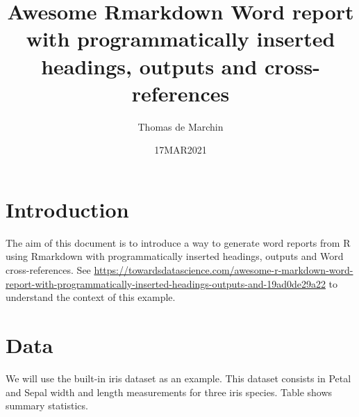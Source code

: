\documentclass[
]{article}
\title{Awesome Rmarkdown Word report with programmatically inserted
headings, outputs and cross-references}
\author{Thomas de Marchin}
\date{17MAR2021}
\begin{document}
\maketitle

\hypertarget{introduction}{%
\section{Introduction}\label{introduction}}

The aim of this document is to introduce a way to generate word reports
from R using Rmarkdown with programmatically inserted headings, outputs
and Word cross-references. See
\url{https://towardsdatascience.com/awesome-r-markdown-word-report-with-programmatically-inserted-headings-outputs-and-19ad0de29a22}
to understand the context of this example.

\hypertarget{data}{%
\section{Data}\label{data}}

We will use the built-in iris dataset as an example. This dataset
consists in Petal and Sepal width and length measurements for three iris
species. Table shows summary statistics.

\providecommand{\docline}[3]{\noalign{\global\setlength{\arrayrulewidth}{#1}}\arrayrulecolor[HTML]{#2}\cline{#3}}

\setlength{\tabcolsep}{2pt}

\renewcommand*{\arraystretch}{1.5}
\end{document}
